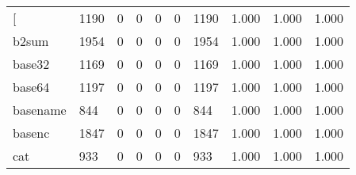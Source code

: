 \begin{longtable}{lp{1.3cm}p{1.3cm}p{1.3cm}p{1.3cm}p{1.3cm}p{1.3cm}p{1.3cm}p{1.3cm}p{1.3cm}}
\bottomrule
\endlastfoot
{[}         &                   1190 &                                  0 &                                 0 &                                0 &                                 0 &                            1190 &                                   1.000 &                                  1.000 &                                1.000 \\
b2sum     &                   1954 &                                  0 &                                 0 &                                0 &                                 0 &                            1954 &                                   1.000 &                                  1.000 &                                1.000 \\
base32    &                   1169 &                                  0 &                                 0 &                                0 &                                 0 &                            1169 &                                   1.000 &                                  1.000 &                                1.000 \\
base64    &                   1197 &                                  0 &                                 0 &                                0 &                                 0 &                            1197 &                                   1.000 &                                  1.000 &                                1.000 \\
basename  &                    844 &                                  0 &                                 0 &                                0 &                                 0 &                             844 &                                   1.000 &                                  1.000 &                                1.000 \\
basenc    &                   1847 &                                  0 &                                 0 &                                0 &                                 0 &                            1847 &                                   1.000 &                                  1.000 &                                1.000 \\
cat       &                    933 &                                  0 &                                 0 &                                0 &                                 0 &                             933 &                                   1.000 &                                  1.000 &                                1.000 \\

\end{longtable}
